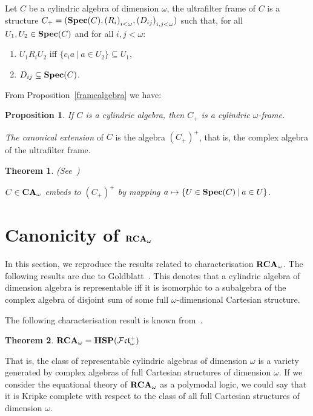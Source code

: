 \documentclass{article}
\theoremstyle{defin}
\theoremstyle{theorem}
\newtheorem{theorem}{Theorem}
\theoremstyle{claim}
\theoremstyle{prop}
\newtheorem{prop}{Proposition}
\theoremstyle{lemma}
\theoremstyle{fact}
\theoremstyle{remark}
\theoremstyle{ex}
\theoremstyle{col}
\theoremstyle{question}
\begin{document}
Let $C$ be a cylindric algebra of dimension $\omega$, the ultrafilter frame of $C$ is a structure 
$C_+ = ({\bf Spec}(C), {(R_i)}_{i < \omega}, {(D_{ij})}_{i, j < \omega})$ such that, 
for all $U_1, U_2 \in {\bf Spec}(C)$ and for all $i, j < \omega$:
\begin{enumerate}
\item $U_1 R_i U_2$ iff $\{ c_i a \: | \: a \in U_2 \} \subseteq U_1$,
\item $D_{ij} \subseteq {\bf Spec}(C)$.
\end{enumerate}

From Proposition~\ref{framealgebra} we have:
\begin{prop}
If $C$ is a cylindric algebra, then $C_+$ is a cylindric $\omega$-frame.
\end{prop}

\emph{The canonical extension} of $C$ is the algebra ${(C_+)}^+$, that is, the complex algebra of the ultrafilter frame.

\begin{theorem} (See~\cite{jonsson1951boolean})

$C \in {\bf CA}_{\omega}$ embeds to ${(C_+)}^+$ by mapping 
$a \mapsto \{ U \in {\bf Spec}(C) \: | \: a \in U \}$.
\end{theorem}

\section{Canonicity of ${\bf RCA}_{\omega}$}

In this section, we reproduce the results related to characterisation ${\bf RCA}_{\omega}$. 
The following results are due to Goldblatt~\cite{goldblatt1995elementary}. 
This denotes that a cylindric algebra of dimension algebra is representable iff 
it is isomorphic to a subalgebra of the complex algebra of disjoint sum of some full 
$\omega$-dimensional Cartesian structure.

\vspace{\baselineskip}

The following characterisation result is known from~\cite[Theorem 2.2.3]{Venema2013}.

\begin{theorem}
${\bf RCA}_{\omega} = {\bf HSP}(\mathcal{F}\mathfrak{ct}_{\omega}^{+})$
\end{theorem}

That is, the class of representable cylindric algebras of dimension $\omega$ is a variety generated by complex algebras of full Cartesian structures of dimension $\omega$. If we consider the equational theory of ${\bf RCA}_{\omega}$ as a polymodal logic, we could say that it is Kripke complete with respect to the class of all full Cartesian structures of dimension $\omega$.
\end{document}
